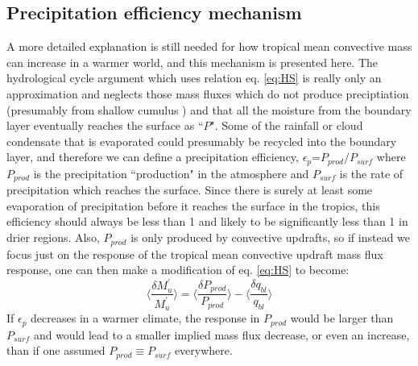 \documentclass[letterpaper,12pt,titlepage,oneside,final]{book}
\begin{document}
\subsection{Precipitation efficiency mechanism}
A more detailed explanation is still needed for how tropical mean convective mass can increase in a warmer world, and this mechanism is presented here. The hydrological cycle argument which uses relation eq. \ref{eq:HS} is really only an approximation and neglects those mass fluxes which do not produce preciptiation (presumably from shallow cumulus \cite{held_robust_2006}) and that all the moisture from the boundary layer eventually reaches the surface as ``$P$". Some of the rainfall or cloud condensate that is evaporated could presumably be recycled into the boundary layer, and therefore we can define a precipitation efficiency, $\epsilon_{p}$=$P_{prod}/P_{surf}$ where $P_{prod}$ is the precipitation ``production" in the atmosphere and $P_{surf}$ is the rate of precipitation which reaches the surface. Since there is surely at least some evaporation of precipitation before it reaches the surface in the tropics, this efficiency should always be less than 1 and likely to be significantly less than 1 in drier regions. Also, $P_{prod}$ is only produced by convective updrafts, so if instead we focus just on the response of the tropical mean convective updraft mass flux response, one can then make a modification of eq. \ref{eq:HS} to become: 
\begin{equation}\label{eq:HS1}
\Bigg\langle\frac{\delta{M^{'}_{u}}}{M^{'}_{u}}\Bigg\rangle=\Bigg\langle\frac{\delta{P_{prod}}}{P_{prod}}\Bigg\rangle-\Bigg\langle\frac{\delta{q_{bl}}}{q_{bl}}\Bigg\rangle
\end{equation}
If $\epsilon_{p}$ decreases in a warmer climate, the response in $P_{prod}$ would be larger than $P_{surf}$ and would lead to a smaller implied mass flux decrease, or even an increase, than if one assumed $P_{prod}\equiv{P_{surf}}$ everywhere. 
\end{document}
